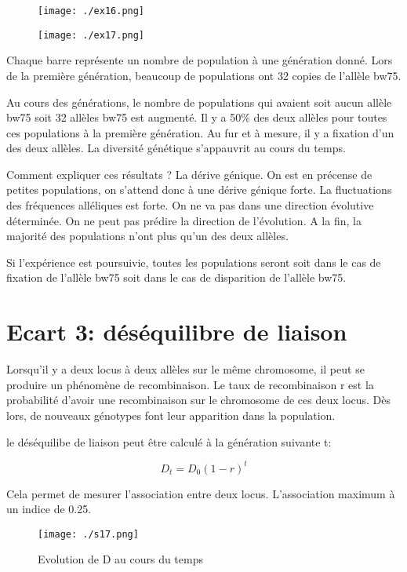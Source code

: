 \documentclass{article}
\begin{document}
\begin{figure}[H]
\texttt{[image: ./ex16.png]}
\end{figure}

\begin{figure}[H]
\texttt{[image: ./ex17.png]}
\end{figure}

Chaque barre représente un nombre de population à une génération donné.
Lors de la première génération, beaucoup de populations ont 32 copies de l'allèle bw75.

Au cours des générations, le nombre de populations qui avaient soit aucun allèle bw75 soit 32 allèles bw75 est augmenté. Il y a 50\% des deux allèles pour toutes ces populations à la première génération. Au fur et à mesure, il y a fixation d'un des deux allèles. La diversité génétique s'appauvrit au cours du temps.

Comment expliquer ces résultats ? La dérive génique. On est en précense de petites populations, on s'attend donc à une dérive génique forte. La fluctuations des fréquences alléliques est forte. On ne va pas dans une direction évolutive déterminée. On ne peut pas prédire la direction de l'évolution. A la fin, la majorité des populations n'ont plus qu'un des deux allèles.

Si l'expérience est poursuivie, toutes les populations seront soit dans le cas de fixation de l'allèle bw75 soit dans le cas de disparition de l'allèle bw75.

\pagebreak

\section{Ecart 3: déséquilibre de liaison}
Lorsqu'il y a deux locus à deux allèles sur le même chromosome, il peut se produire un phénomène de recombinaison. Le taux de recombinaison r est la probabilité d'avoir une recombinaison sur le chromosome de ces deux locus. Dès lors, de nouveaux génotypes font leur apparition dans la population.

le déséquilibe de liaison peut être calculé à la génération suivante t:

\begin{equation}
D_t = D_0(1-r)^t
\end{equation}

Cela permet de mesurer l'association entre deux locus. L'association maximum à un indice de 0.25.

\begin{figure}[H]
\texttt{[image: ./s17.png]}
\caption{Evolution de D au cours du temps}
\end{figure}
\end{document}
